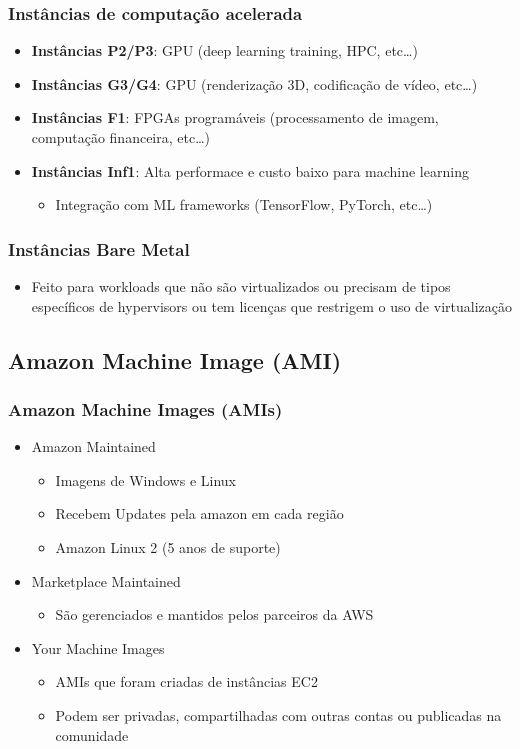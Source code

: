 \begin{frame}
	\frametitle{Instâncias de computação acelerada}
	\begin{itemize}
		\item \textbf{Instâncias P2/P3}: GPU (deep learning training, HPC, etc\dots)
		\item \textbf{Instâncias G3/G4}: GPU (renderização 3D, codificação de vídeo, etc\dots)
		\item \textbf{Instâncias F1}: FPGAs programáveis (processamento de imagem, computação financeira, etc\dots)
		\item \textbf{Instâncias Inf1}: Alta performace e custo baixo para machine learning
			\begin{itemize}
				\item Integração com ML frameworks (TensorFlow, PyTorch, etc\dots)
			\end{itemize}
	\end{itemize}
\end{frame}

\begin{frame}
	\frametitle{Instâncias Bare Metal}
	\begin{itemize}
		\item Feito para workloads que não são virtualizados ou precisam de tipos específicos de hypervisors ou tem licenças que restrigem o uso de virtualização
	\end{itemize}
\end{frame}

\subsection{Amazon Machine Image (AMI)}

\begin{frame}
	\frametitle{Amazon Machine Images (AMIs)}
	\begin{itemize}
		\item Amazon Maintained
			\begin{itemize}
				\item Imagens de Windows e Linux
				\item Recebem Updates pela amazon em cada região
				\item Amazon Linux 2 (5 anos de suporte)
			\end{itemize}
		\item Marketplace Maintained
			\begin{itemize}
				\item São gerenciados e mantidos pelos parceiros da AWS
			\end{itemize}
		\item Your Machine Images
			\begin{itemize}
				\item AMIs que foram criadas de instâncias EC2
				\item Podem ser privadas, compartilhadas com outras contas ou publicadas na comunidade
			\end{itemize}
	\end{itemize}
\end{frame}

